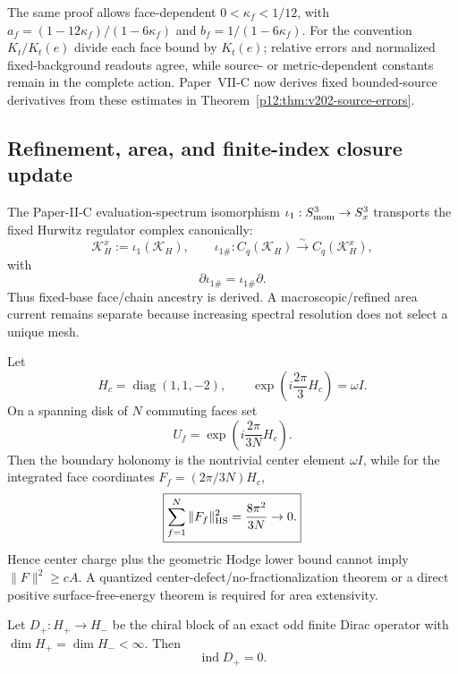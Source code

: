 \documentclass[12pt,a4paper]{article}
\begin{document}
The same proof allows face-dependent $0<\kappa_f<1/12$, with
$a_f=(1-12\kappa_f)/(1-6\kappa_f)$ and
$b_f=1/(1-6\kappa_f)$. For the convention $K_t/K_t(e)$ divide each
face bound by $K_t(e)$; relative errors and normalized fixed-background
readouts agree, while source- or metric-dependent constants remain in the
complete action. Paper~VII-C now derives fixed bounded-source derivatives
from these estimates in Theorem~\ref{p12:thm:v202-source-errors}.


\subsection{Refinement, area, and finite-index closure update}
\label{p10:sec:g7-g8-g9-update}

The Paper-II-C evaluation-spectrum isomorphism
$\iota_1:S^3_{\rm mom}\to S^3_x$ transports the fixed Hurwitz regulator
complex canonically:
\[
 \mathcal K_H^x:=\iota_1(\mathcal K_H),
 \qquad
 \iota_{1\#}:C_q(\mathcal K_H)\overset\sim\longrightarrow C_q(\mathcal K_H^x),
\]
with
\[
 \partial\iota_{1\#}=\iota_{1\#}\partial.
\]
Thus fixed-base face/chain ancestry is derived.  A macroscopic/refined area
current remains separate because increasing spectral resolution does not
select a unique mesh.

\begin{proposition}
\label{p10:prop:center-fractionalization-no-area}
Let
\[
 H_c=\operatorname{diag}(1,1,-2),
 \qquad
 \exp\!\left(i\frac{2\pi}{3}H_c\right)=\omega I.
\]
On a spanning disk of $N$ commuting faces set
\[
 U_f=\exp\!\left(i\frac{2\pi}{3N}H_c\right).
\]
Then the boundary holonomy is the nontrivial center element $\omega I$, while
for the integrated face coordinates
$F_f=(2\pi/3N)H_c$,
\[
 \boxed{\sum_{f=1}^N\|F_f\|_{\rm HS}^2=\frac{8\pi^2}{3N}\to0.}
\]
Hence center charge plus the geometric Hodge lower bound cannot imply
$\|F\|^2\ge cA$.  A quantized center-defect/no-fractionalization theorem or a
direct positive surface-free-energy theorem is required for area extensivity.
\end{proposition}

\begin{proposition}
\label{p10:prop:finite-exact-chiral-index-zero}
Let $D_+:H_+\to H_-$ be the chiral block of an exact odd finite Dirac operator
with $\dim H_+=\dim H_-<\infty$.  Then
\[
 \boxed{\operatorname{ind}D_+=0.}
\]
\end{proposition}
\end{document}
